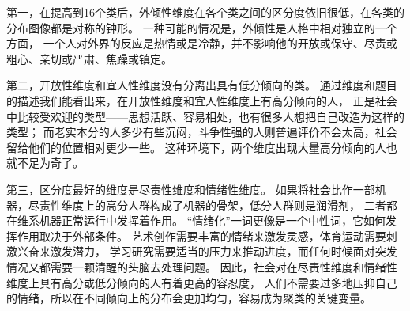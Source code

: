 \documentclass[UTF8]{ctexart}
\begin{document}
第一，在提高到16个类后，外倾性维度在各个类之间的区分度依旧很低，在各类的分布图像都是对称的钟形。
一种可能的情况是，外倾性是人格中相对独立的一个方面，
一个人对外界的反应是热情或是冷静，并不影响他的开放或保守、尽责或粗心、亲切或严肃、焦躁或镇定。\par
第二，开放性维度和宜人性维度没有分离出具有低分倾向的类。
通过维度和题目的描述我们能看出来，在开放性维度和宜人性维度上有高分倾向的人，
正是社会中比较受欢迎的类型——思想活跃、容易相处，也有很多人想把自己改造为这样的类型；
而老实本分的人多少有些沉闷，斗争性强的人则普遍评价不会太高，社会留给他们的位置相对更少一些。
这种环境下，两个维度出现大量高分倾向的人也就不足为奇了。\par
第三，区分度最好的维度是尽责性维度和情绪性维度。
如果将社会比作一部机器，尽责性维度上的高分人群构成了机器的骨架，低分人群则是润滑剂，
二者都在维系机器正常运行中发挥着作用。
“情绪化”一词更像是一个中性词，它如何发挥作用取决于外部条件。
艺术创作需要丰富的情绪来激发灵感，体育运动需要刺激兴奋来激发潜力，
学习研究需要适当的压力来推动进度，而任何时候面对突发情况又都需要一颗清醒的头脑去处理问题。
因此，社会对在尽责性维度和情绪性维度上具有高分或低分倾向的人有着更高的容忍度，
人们不需要过多地压抑自己的情绪，所以在不同倾向上的分布会更加均匀，容易成为聚类的关键变量。
\end{document}
